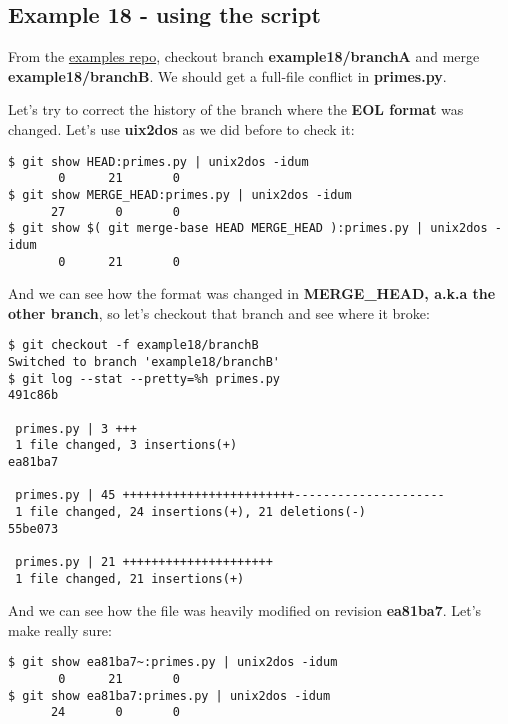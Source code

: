 \subsection{Example 18 - using the script}
\label{example18}

From the \hyperref[examples_repo]{examples repo}, checkout branch {\bf example18/branchA} and merge {\bf example18/branchB}. We
should get a full-file conflict in {\bf primes.py}.

Let's try to correct the history of the branch where the {\bf EOL format} was changed. Let's use {\bf uix2dos} as we did before to check it:

\begin{lstlisting}[style=console_style,
	basicstyle=\small,
	caption={\bf example 18} - EOL formats]
$ git show HEAD:primes.py | unix2dos -idum
       0      21       0
$ git show MERGE_HEAD:primes.py | unix2dos -idum
      27       0       0
$ git show $( git merge-base HEAD MERGE_HEAD ):primes.py | unix2dos -idum
       0      21       0
\end{lstlisting}

And we can see how the format was changed in {\bf MERGE\_HEAD, a.k.a the other branch}, so let's checkout that branch and see where it broke:

\begin{lstlisting}[style=console_style,
	basicstyle=\small,
	caption={\bf example 18} - Find out where it broke]
$ git checkout -f example18/branchB
Switched to branch 'example18/branchB'
$ git log --stat --pretty=%h primes.py
491c86b

 primes.py | 3 +++
 1 file changed, 3 insertions(+)
ea81ba7

 primes.py | 45 ++++++++++++++++++++++++---------------------
 1 file changed, 24 insertions(+), 21 deletions(-)
55be073

 primes.py | 21 +++++++++++++++++++++
 1 file changed, 21 insertions(+)
\end{lstlisting}

And we can see how the file was heavily modified on revision {\bf ea81ba7}. Let's make really sure:

\begin{lstlisting}[style=console_style,
	basicstyle=\small,
	caption={\bf example 18} - double checking]
$ git show ea81ba7~:primes.py | unix2dos -idum
       0      21       0
$ git show ea81ba7:primes.py | unix2dos -idum
      24       0       0
\end{lstlisting}

